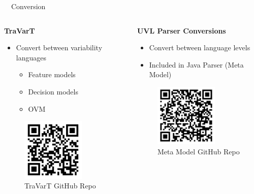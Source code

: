 \documentclass[
	aspectratio=169, %
	8pt, %
	nosectionframes, %
]{beamer}
\newcommand{\inlinesubtitle}[1]{\textcolor{gray!60}{~{}~#1}}
\begin{document}
\begin{frame}{\insertsection \inlinesubtitle{Conversion}}
    	\begin{columns}
		\begin{column}{0.49\textwidth}
			\textbf{TraVarT}
            \begin{itemize}
                \item Convert between variability languages
                \begin{itemize}
                    \item Feature models
                    \item Decision models
                    \item OVM
                \end{itemize}
            \end{itemize}
            \begin{figure}
                \centering
                \includegraphics[width=3cm]{pics/qr/travart.pdf}
                \caption{TraVarT GitHub Repo}
            \end{figure}

		\end{column}

		\begin{column}{0.49\textwidth}
			\textbf{UVL Parser Conversions}
   \begin{itemize}
       \item Convert between language levels
       \item Included in Java Parser (Meta Model)
   \end{itemize}
               \begin{figure}
                \centering
                \includegraphics[width=3cm]{pics/qr/metamodel.pdf}
                \caption{Meta Model GitHub Repo}
            \end{figure}
   
		\end{column}
	\end{columns}
\end{frame}
\end{document}
